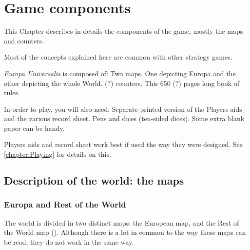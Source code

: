



\chapter{Game components}\label{chapter:Basics}
\begin{designnote}
  This Chapter describes in details the components of the game, mostly the
  maps and counters.

  Most of the concepts explained here are common with other strategy games.
\end{designnote}

\aparag \emph{Europa Universalis} is composed of:
\bparag Two maps. One depicting Europa and the other depicting the whole
World.
 (?) counters.
\bparag This 650 (?) pages long book of rules.

\aparag In order to play, you will also need:
\bparag Separate printed version of the Players aids and the various record
sheet.
\bparag Pens and dices (ten-sided dices).
\bparag Some extra blank paper can be handy.

\aparag Players aids and record sheet work best if used the way they were
designed. See \ref{chapter:Playing} for details on this.




\section{Description of the world: the maps}




\subsection{Europa and Rest of the World}

 The world is divided in two distinct maps: the European map,
and the Rest of the World map (\ROTW). Although there is a lot in common to
the way these maps can be read, they do not work in the same way.

